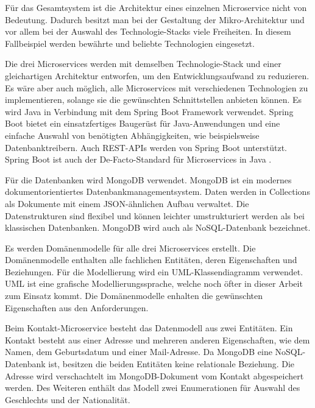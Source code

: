 Für das Gesamtsystem ist die Architektur eines einzelnen Microservice nicht von Bedeutung. Dadurch besitzt man bei der Gestaltung der Mikro-Architektur und vor allem bei der Auswahl des Technologie-Stacks viele Freiheiten. In diesem Fallbeispiel werden bewährte und beliebte Technologien eingesetzt.

Die drei Microservices werden mit demselben Technologie-Stack und einer gleichartigen Architektur entworfen, um den Entwicklungsaufwand zu reduzieren. Es wäre aber auch möglich, alle Microservices mit verschiedenen Technologien zu implementieren, solange sie die gewünschten Schnittstellen anbieten können. Es wird Java in Verbindung mit dem Spring Boot Framework verwendet. Spring Boot bietet ein einsatzfertiges Baugerüst für Java-Anwendungen und eine einfache Auswahl von benötigten Abhängigkeiten, wie beispielsweise Datenbanktreibern. Auch REST-APIs werden von Spring Boot unterstützt. Spring Boot ist auch der De-Facto-Standard für Microservices in Java \parencite[vgl.][]{vmwareinc.Spring2022}.

Für die Datenbanken wird MongoDB verwendet. MongoDB ist ein modernes dokumentorientiertes Datenbankmanagementsystem. Daten werden in Collections als Dokumente mit einem \ac{JSON}-ähnlichen Aufbau verwaltet. Die Datenstrukturen sind flexibel und können leichter umstrukturiert werden als bei klassischen Datenbanken. MongoDB wird auch als NoSQL-Datenbank bezeichnet.

Es werden Domänenmodelle für alle drei Microservices erstellt. Die Domänenmodelle enthalten alle fachlichen Entitäten, deren Eigenschaften und Beziehungen. Für die Modellierung wird ein \acs{UML}-Klassendiagramm verwendet. \ac{UML} ist eine grafische Modellierungssprache, welche noch öfter in dieser Arbeit zum Einsatz kommt. Die Domänenmodelle enhalten die gewünschten Eigenschaften aus den Anforderungen.

Beim Kontakt-Microservice besteht das Datenmodell aus zwei Entitäten. Ein Kontakt besteht aus einer Adresse und mehreren anderen Eigenschaften, wie dem Namen, dem Geburtsdatum und einer Mail-Adresse. Da MongoDB eine NoSQL-Datenbank ist, besitzen die beiden Entitäten keine relationale Beziehung. Die Adresse wird verschachtelt im MongoDB-Dokument vom Kontakt abgespeichert werden. Des Weiteren enthält das Modell zwei Enumerationen für Auswahl des Geschlechts und der Nationalität.

